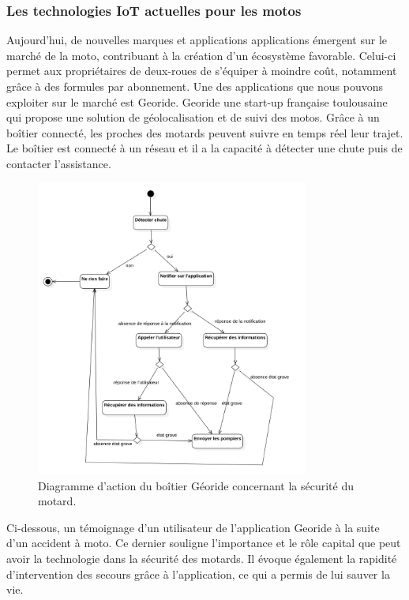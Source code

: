 \subsubsection{Les technologies IoT actuelles pour les motos}
Aujourd’hui, de nouvelles marques et applications \cite{iot_accessoire_moto} applications émergent sur le marché de la moto, contribuant à la création d’un écosystème favorable. Celui-ci permet aux propriétaires de deux-roues de s’équiper à moindre coût, notamment grâce à des formules par abonnement. Une des applications que nous pouvons exploiter sur le marché est Georide. Georide une start-up française toulousaine qui propose une solution de géolocalisation et de suivi des motos. Grâce à un boîtier connecté, les proches des motards peuvent suivre en temps réel leur trajet. Le boîtier est connecté à un réseau et il a la capacité à détecter une chute puis de contacter l'assistance. 
\begin{figure}[H]
    \centering
    \includegraphics[width=0.8\textwidth]{images/diag_etat_georide.png} 
    \caption{Diagramme d'action du boîtier Géoride concernant la sécurité du motard.}
\end{figure}
Ci-dessous, un témoignage d'un utilisateur de l'application Georide à la suite d'un accident à moto. Ce dernier souligne l'importance et le rôle capital que peut avoir la technologie dans la sécurité des motards. Il évoque également la rapidité d'intervention des secours grâce à l'application, ce qui a permis de lui sauver la vie.
